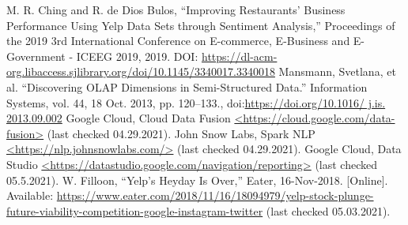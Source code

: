 \documentclass[11pt,journal,compsoc]{IEEEtran}
\begin{document}

%
%
%
\begin{thebibliography}{1}

M. R. Ching and R. de Dios Bulos, “Improving Restaurants' Business Performance Using Yelp Data Sets through Sentiment Analysis,” Proceedings of the 2019 3rd International Conference on E-commerce, E-Business and E-Government - ICEEG 2019, 2019. DOI:
\url{https://dl-acm-org.libaccess.sjlibrary.org/doi/10.1145/3340017.3340018}
Mansmann, Svetlana, et al. “Discovering OLAP Dimensions in Semi-Structured Data.” Information Systems, vol. 44, 18 Oct. 2013, pp. 120–133., doi:\url{https://doi.org/10.1016/ j.is. 2013.09.002}
Google Cloud, Cloud Data Fusion \url{<https://cloud.google.com/data-fusion>} (last checked 04.29.2021).
John Snow Labs, Spark NLP \url{<https://nlp.johnsnowlabs.com/>} (last checked 04.29.2021).
Google Cloud, Data Studio \url{<https://datastudio.google.com/navigation/reporting>} (last checked 05.5.2021).
W. Filloon, “Yelp's Heyday Is Over,” Eater, 16-Nov-2018. [Online]. Available: \url{https://www.eater.com/2018/11/16/18094979/yelp-stock-plunge-future-viability-competition-google-instagram-twitter} (last checked 05.03.2021). 
\end{thebibliography}

% 
\end{document}
